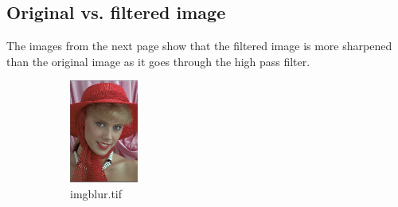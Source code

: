 \documentclass{article}
\begin{document}
\subsection{Original vs. filtered image}
The images from the next page show that the filtered image is more sharpened than the original image as it goes through the high pass filter.
\begin{figure}[h]
\begin{subfigure}{0.5\textwidth}
\includegraphics[width=0.9\linewidth, left]{imgblur} 
\caption{imgblur.tif}
\end{subfigure}
\begin{subfigure}{0.5\textwidth}

\end{subfigure}
\end{figure}
\end{document}
